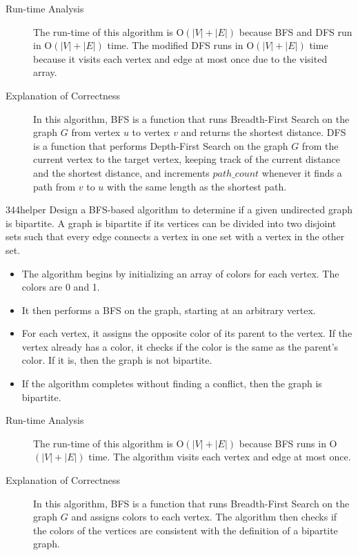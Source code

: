 \documentclass[boxes]{rutgers_hw}
\begin{document}
    \begin{description}
        \item[Run-time Analysis] The run-time of this algorithm is O$(|V| + |E|)$ because BFS and DFS run in O$(|V| + |E|)$ time. The modified DFS runs in O$(|V| + |E|)$ time because it visits each vertex and edge at most once due to the visited array.
        \item[Explanation of Correctness] In this algorithm, BFS is a function that runs Breadth-First Search on the graph $G$ from vertex $u$ to vertex $v$ and returns the shortest distance. DFS is a function that performs Depth-First Search on the graph $G$ from the current vertex to the target vertex, keeping track of the current distance and the shortest distance, and increments $path\_count$ whenever it finds a path from $v$ to $u$ with the same length as the shortest path.
    \end{description}

    \begin{exern}{344helper}
        Design a BFS-based algorithm to determine if a given undirected graph is bipartite. A graph is bipartite if its vertices can be divided into two disjoint sets such that every edge connects a vertex in one set with a vertex in the other set.
    \end{exern}

    \begin{itemize}
        \item The algorithm begins by initializing an array of colors for each vertex. The colors are 0 and 1.
        \item It then performs a BFS on the graph, starting at an arbitrary vertex.
        \item For each vertex, it assigns the opposite color of its parent to the vertex. If the vertex already has a color, it checks if the color is the same as the parent's color. If it is, then the graph is not bipartite.
        \item If the algorithm completes without finding a conflict, then the graph is bipartite.
    \end{itemize}

    \begin{description}
        \item[Run-time Analysis] The run-time of this algorithm is O$(|V| + |E|)$ because BFS runs in O$(|V| + |E|)$ time. The algorithm visits each vertex and edge at most once.
        \item[Explanation of Correctness] In this algorithm, BFS is a function that runs Breadth-First Search on the graph $G$ and assigns colors to each vertex. The algorithm then checks if the colors of the vertices are consistent with the definition of a bipartite graph.
    \end{description}
\end{document}
